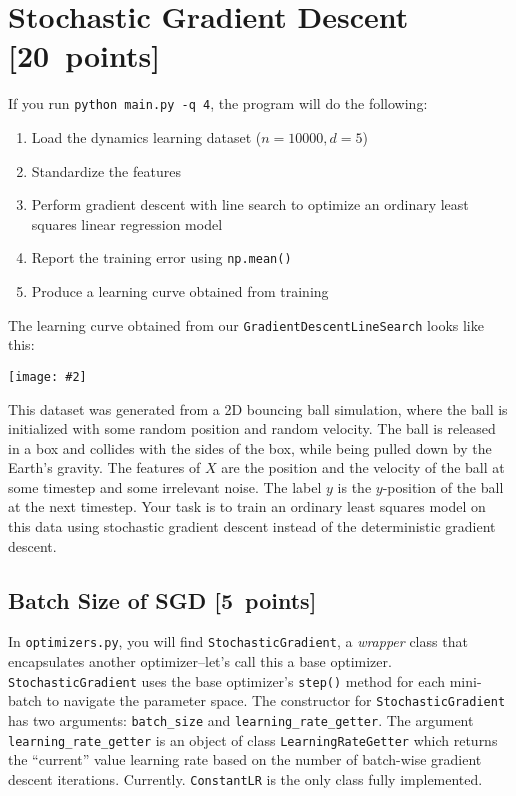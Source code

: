 \documentclass{article}
\newcommand\pts[1]{\textcolor{pointscolour}{[#1~points]}}
\newcommand{\centerfig}[2]{\begin{center}\texttt{[image: \#2]}\end{center}}
\begin{document}
\clearpage
\section{Stochastic Gradient Descent \pts{20}}

If you run \verb|python main.py -q 4|, the program will do the following:
\begin{enumerate}
	\item Load the dynamics learning dataset ($n = 10000, d = 5$)
	\item Standardize the features
	\item Perform gradient descent with line search to optimize an ordinary least squares linear regression model
	\item Report the training error using \texttt{np.mean()}
	\item Produce a learning curve obtained from training
\end{enumerate}

The learning curve obtained from our \texttt{GradientDescentLineSearch} looks like this:
\centerfig{.6}{./figs/gd_line_search_curve.png}

This dataset was generated from a 2D bouncing ball simulation, where the ball is initialized with some random position and random velocity. The ball is released in a box and collides with the sides of the box, while being pulled down by the Earth's gravity. The features of $X$ are the position and the velocity of the ball at some timestep and some irrelevant noise. The label $y$ is the $y$-position of the ball at the next timestep. Your task is to train an ordinary least squares model on this data using stochastic gradient descent instead of the deterministic gradient descent.

\subsection{Batch Size of SGD \pts{5}}

In \texttt{optimizers.py}, you will find \texttt{StochasticGradient}, a \textit{wrapper} class that encapsulates another optimizer--let's call this a base optimizer.
\texttt{StochasticGradient} uses the base optimizer's \texttt{step()} method for each mini-batch to navigate the parameter space.
The constructor for \texttt{StochasticGradient} has two arguments: \texttt{batch\_size} and \texttt{learning\_rate\_getter}. The argument \texttt{learning\_rate\_getter} is an object of class \texttt{LearningRateGetter} which returns the ``current'' value learning rate based on the number of batch-wise gradient descent iterations. Currently. \texttt{ConstantLR} is the only class fully implemented.
\end{document}
